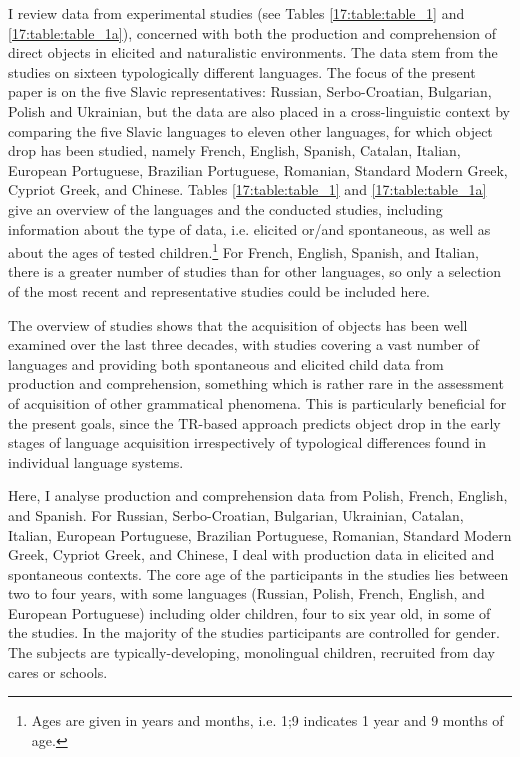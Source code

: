 \documentclass[output=paper,modfonts,newtxmath,hidelinks,]{langscibook}
\begin{document}
I review data from experimental studies (see Tables \ref{17:table:table_1} and \ref{17:table:table_1a}), concerned with both the production and comprehension of direct objects in elicited and naturalistic environments. The data stem from the studies on sixteen typologically different languages. The focus of the present paper is on the five Slavic representatives: Russian, Serbo-Croatian, Bulgarian, Polish and Ukrainian, but the data are also placed in a cross-linguistic context by comparing the five Slavic languages to eleven other languages, for which object drop has been studied, namely French, English, Spanish, Catalan, Italian, European Portuguese, Brazilian Portuguese, Romanian, Standard Modern Greek, Cypriot Greek, and Chinese. Tables \ref{17:table:table_1} and \ref{17:table:table_1a} give an overview of the languages and the conducted studies, including information about the type of data, i.e. elicited or/and spontaneous, as well as about the ages of tested children.\footnote{\label{17:fn3}Ages are given in years and months, i.e. 1;9 indicates 1 year and 9 months of age.} For French, English, Spanish, and Italian, there is a greater number of studies than for other languages, so only a selection of the most recent and representative studies could be included here.

The overview of studies shows that the acquisition of objects has been well examined over the last three decades, with studies covering a vast number of languages and providing both spontaneous and elicited child data from production and comprehension, something which is rather rare in the assessment of acquisition of other grammatical phenomena. This is particularly beneficial for the present goals, since the TR-based approach predicts object drop in the early stages of language acquisition irrespectively of typological differences found in individual language systems.\largerpage[-2]

Here, I analyse production and comprehension data from Polish, French, English, and Spanish. For Russian, Serbo-Croatian, Bulgarian, Ukrainian, Catalan, Italian, European Portuguese, Brazilian Portuguese, Romanian, Standard Modern Greek, Cypriot Greek, and Chinese, I deal with production data in elicited and spontaneous contexts. The core age of the participants in the studies lies between two to four years, with some languages (Russian, Polish, French, English, and European Portuguese) including older children, four to six year old, in some of the studies. In the majority of the studies participants are controlled for gender. The subjects are typically-developing, monolingual children, recruited from day cares or schools.
\end{document}
